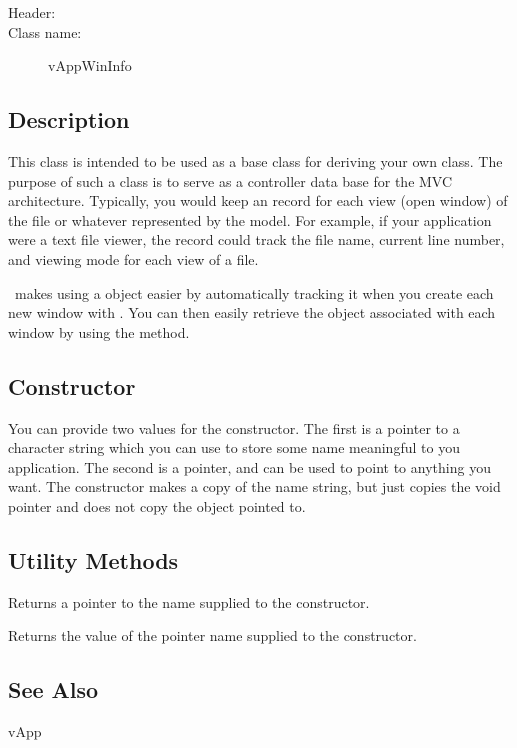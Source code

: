 \begin{description}
	\item [Header:] 
	\item [Class name:] vAppWinInfo
\end{description}

\subsection* {Description}

This class is intended to be used as a base class for deriving
your own  class. The purpose of such a class is
to serve as a controller data base for the MVC architecture. Typically,
you would keep an  record for each view (open window)
of the file or whatever represented by the model. For example, if
your application were a text file viewer, the  record
could track the file name, current line number, and viewing mode
for each view of a file.

\V\ makes using a  object easier by
automatically tracking it when you create each new window with
. You can then easily retrieve the 
object associated with each window by using the 
method.

\subsection* {Constructor} %


You can provide two values for the  constructor.
The first is a pointer to a character string which you can use
to store some name meaningful to you application. The second is a
 pointer, and can be used to point to anything you
want. The constructor makes a copy of the name string, but just
copies the void pointer and does not copy the object pointed to.

\subsection* {Utility Methods}


Returns a pointer to the name supplied to the constructor.


Returns the value of the pointer name supplied to the constructor.


\subsection* {See Also}

vApp
